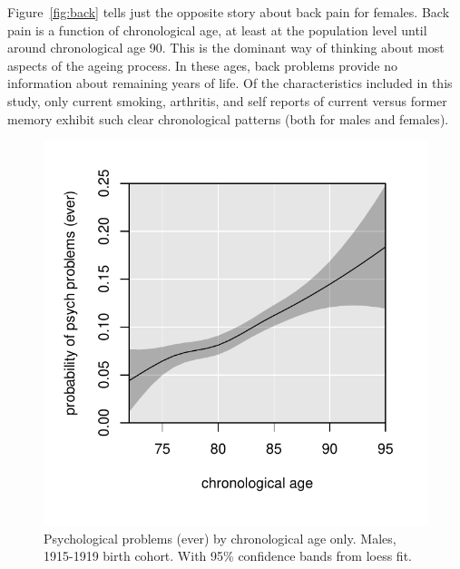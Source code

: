 \documentclass[11pt,oneside]{article} %
\begin{document}
Figure~\ref{fig:back} tells just the opposite story about back pain for females.
Back pain is a function of
chronological age, at least at the population level until around chronological
age 90. This is the dominant way of thinking about most aspects of the ageing
process. In these ages, back problems provide no information about remaining
years of life. Of the characteristics included in this
study, only current smoking, arthritis, and self reports of current versus former memory exhibit such clear chronological patterns (both for males and
females).
\begin{figure}[!h]
 \centering
   \caption{Psychological problems (ever) by chronological age only. Males, 1915-1919 birth
    cohort. With 95{\%} confidence bands from loess fit.}
    \label{fig:chronofalse}
   \includegraphics[scale=.7]{Figures/MalePsychChrono.pdf}
\end{figure}
\end{document}

